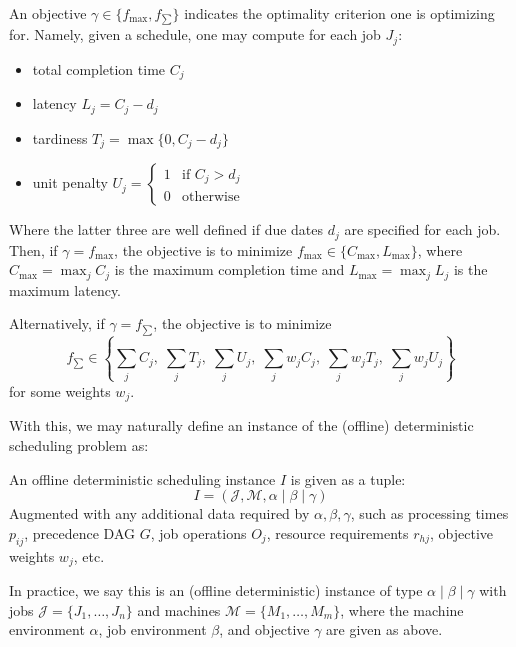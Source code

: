 \begin{definition}[Objective]
    An objective $\gamma \in \{f_{\max}, f_{\sum}\}$ indicates the optimality criterion one is optimizing for. Namely, given a schedule, one may compute for each job $J_j$:
    \begin{itemize}
        \item total completion time $C_j$
        \item latency $L_j = C_j - d_j$
        \item tardiness $T_j = \max\{0, C_j - d_j\}$
        \item unit penalty $U_j = \begin{cases}
            1 & \text{if } C_j > d_j \\ 0 & \text{otherwise}
        \end{cases}$
    \end{itemize}
    Where the latter three are well defined if due dates $d_j$ are specified for each job. Then, if $\gamma = f_{\max}$, the objective is to minimize
    $f_{\max} \in \{C_{\max}, L_{\max}\}$, where $C_{\max} = \max_{j} C_j$ is the maximum completion time and $L_{\max} = \max_{j} L_j$ is the maximum latency.
    
    Alternatively, if $\gamma = f_{\sum}$, the objective is to minimize
    $$f_{\sum} \in \left\{\sum_j C_j,\; \sum_j T_j,\; \sum_j U_j,\; \sum_j w_j C_j,\; \sum_j w_j T_j,\; \sum_j w_j U_j\right\}$$
    for some weights $w_j$.
\end{definition}

With this, we may naturally define an instance of the (offline) deterministic scheduling problem as:

\begin{definition}
    An offline deterministic scheduling instance $I$ is given as a tuple:
    $$
        I = (\mathcal J, \mathcal M, \alpha \mid  \beta \mid  \gamma)
    $$
    Augmented with any additional data required by $\alpha, \beta,\gamma$, such as processing times $p_{ij}$, precedence DAG $G$, job operations $O_j$, resource requirements $r_{hj}$, objective weights $w_j$, etc.

    In practice, we say this is an (offline deterministic) instance of type $\alpha\mid \beta\mid \gamma$ with jobs $\mathcal{J} = \{J_1,\dots,J_n\}$ and machines $\mathcal{M} = \{M_1,\dots,M_m\}$, where the machine environment $\alpha$, job environment $\beta$, and objective $\gamma$ are given as above.
\end{definition}


